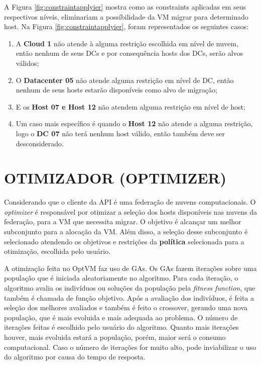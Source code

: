 A Figura \ref{fig:constraintapplyier} mostra como as constraints aplicadas em seus respectivos níveis, eliminariam a possíbilidade
da VM migrar para determinado host. Na Figura \ref{fig:constraintapplyier}, foram representados os seguintes casos:

\begin{enumerate}
\item A \textbf{Cloud 1} não atende à alguma restrição escolhida em nível de nuvem, então nenhum de seus DCs e por consequência hosts dos DCs, serão alvos válidos;
\item O \textbf{Datacenter 05} não atende alguma restrição em nível de DC, então nenhum de seus hosts estarão disponíveis como alvo de migração;
\item E os \textbf{Host 07 e Host 12} não atendem alguma restrição em nível de host;
\item Um caso mais específico é quando o \textbf{Host 12} não atende a alguma restrição, logo o \textbf{DC 07} não terá nenhum host válido, então também deve ser desconsiderado.
\end{enumerate}

\section{OTIMIZADOR (OPTIMIZER)}

Considerando que o cliente da API é uma federação de nuvens computacionais.
O \textit{optimizer} é responsável por otimizar a seleção dos hosts disponíveis nas nuvens da federação,
para a VM que necessita migrar. O objetivo é alcançar um melhor subconjunto para a alocação da VM. 
Além disso, a seleção desse subconjunto é selecionado atendendo os objetivos e restrições da \textbf{política} 
selecionada para a otimização, escolhida pelo usuário.

A otimização feita no OptVM faz uso de GAs. Os GAs fazem iterações sobre 
uma população que é iniciada aleatoriamente no algoritmo. Para cada iteração,
o algoritmo avalia os indivíduos ou soluções da população pela \textit{fitness function}, 
que também é chamada de função objetivo. Após a avaliação dos indivíduos, é
feita a seleção dos melhores avaliados e também é feito o crossover, gerando uma nova população,
que é mais evoluida e mais adequada ao problema. O número de iterações
feitas é escolhido pelo usuário do algoritmo. Quanto mais iterações houver, mais evoluida
estará a população, porém, maior será o consumo computacional. Caso o número de iterações
for muito alto, pode inviabilizar o uso do algoritmo por causa do tempo de resposta.

